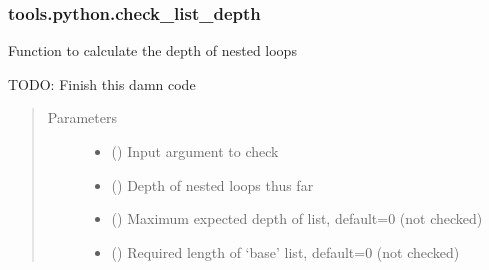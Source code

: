 \documentclass[letterpaper,10pt,english]{sphinxmanual}
\begin{document}
\subsubsection{tools.python.check\_list\_depth}
\label{\detokenize{_autosummary/tools.python.check_list_depth:tools-python-check-list-depth}}\label{\detokenize{_autosummary/tools.python.check_list_depth::doc}}

\begin{fulllineitems}
\label{\detokenize{_autosummary/tools.python.check_list_depth:tools.python.check_list_depth}}
\sphinxAtStartPar
Function to calculate the depth of nested loops

\sphinxAtStartPar
TODO: Finish this damn code
\begin{quote}\begin{description}
\item[{Parameters}] \leavevmode\begin{itemize}
\item {} 
\sphinxAtStartPar
{} () \textendash{} Input argument to check

\item {} 
\sphinxAtStartPar
{} (\sphinxstyleliteralemphasis{\sphinxupquote{, }}) \textendash{} Depth of nested loops thus far

\item {} 
\sphinxAtStartPar
{} (\sphinxstyleliteralemphasis{\sphinxupquote{, }}) \textendash{} Maximum expected depth of list, default=0 (not checked)

\item {} 
\sphinxAtStartPar
{} (\sphinxstyleliteralemphasis{\sphinxupquote{, }}) \textendash{} Required length of ‘base’ list, default=0 (not checked)


\end{itemize}
\end{description}
\end{quote}
\end{fulllineitems}
\end{document}
